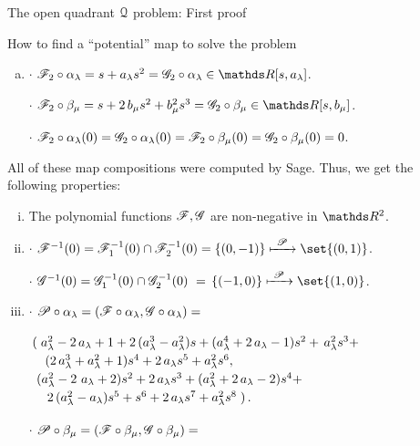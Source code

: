 \documentclass[11pt, a4paper, english, twoside, notitlepage, openright]{report}
\begin{document}
\begin{chapter}{The open quadrant $\mathcal{Q}$ problem: First proof}
\begin{section}{How to find a ``potential'' map to solve the problem}
\begin{enumerate}[(a)]
\item $\cdot$ $\F_2\circ\alpha_{\lambda }= s+a_{\lambda} s^{2} = \G_2\circ\alpha_{\lambda}\in\R[s,a_{\lambda }]$.
			
$\cdot$ $\F_2\circ\beta_{\mu}= s+2 \, b_{\mu} s^{2}+b_{\mu}^{2} s^{3} = \G_2\circ\beta_{\mu}\in\R[s,b_{\mu}]$.
				
$\cdot$ $\mathscr{F}_2\circ\alpha_{\lambda }(0)=\mathscr{G}_2\circ\alpha_{\lambda}(0)=\mathscr{F}_2\circ\beta_{\mu}(0)=\mathscr{G}_2\circ\beta_{\mu}(0)=0$.
\end{enumerate}
All of these map compositions were computed by Sage. Thus, we get the following properties:
		
\begin{enumerate}[(i)]
		
\item The polynomial functions $\mathscr{F},\mathscr{G}$ are non-negative in $\R^2$.
		
\item $\cdot$ $\F^{-1}(0)=\F_1^{-1}(0)\cap\F_2^{-1}(0)=\{(0,-1)\}\xmapsto{\ \P\ }\set{(0,1)}$.
			
$\cdot$ $\G^{-1}(0)=\G_1^{-1}(0)\cap \G_2^{-1}(0)\ =\, \{(-1,0)\} \xmapsto{\ \P\ } \set{(1,0)}$.
		
\item $\cdot$ $\mathscr{P}\circ\alpha_{\lambda}=(\mathscr{F}\circ\alpha_{\lambda },\mathscr{G}\circ\alpha_{\lambda})=$
			
$\arraycolsep=2pt\def\arraystretch{1.2}
\begin{array}{l}
\left(\right.a_{\lambda}^{2}-2 \,a_{\lambda}+1+2 \,{(a_{\lambda}^{3}-a_{\lambda}^{2})}s+{(a_{\lambda}^{4}+2 \, a_{\lambda}-1)} s^{2}+ \,a_{\lambda}^{2} s^{3}+\\
\quad {(2\, a_{\lambda}^{3}+a_{\lambda}^{2}+1)}s^{4}+2 \,a_{\lambda} s^{5}+a_{\lambda}^{2} s^{6},\\		
\ {(a_{\lambda}^{2}-2 \ a_{\lambda}+2)} s^{2}+2 \, a_{\lambda} s^{3}+{(a_{\lambda}^{2}+2 \,a_{\lambda}-2)}s^{4}+\\
\quad \,2 \,{(a_{\lambda}^{2}-a_{\lambda})}s^{5}+s^{6}+2\,a_{\lambda} s^{7}+a_{\lambda}^{2}s^{8}\left.\right).
\end{array}
$
				
$\cdot$ $\mathscr{P}\circ\beta_{\mu}=(\mathscr{F}\circ\beta_{\mu},\mathscr{G}\circ\beta_{\mu})=
$
				

\end{enumerate}
\end{section}
\end{chapter}
\end{document}
